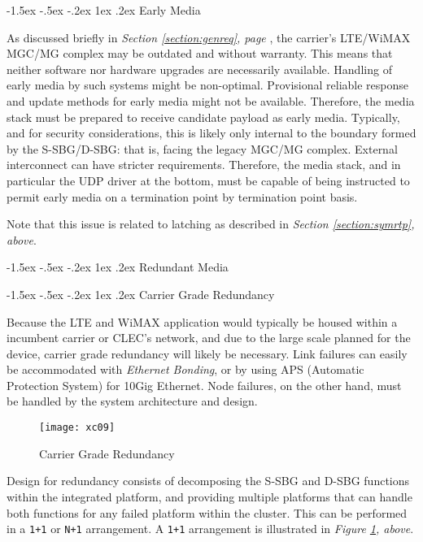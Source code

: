 \documentclass[letterpaper,final,notitlepage,twocolumn,10pt,twoside]{article}
\makeatletter
\let\normalsize = \small
\let\small = \footnotesize
\let\footnotesize = \scriptsize
\let\scriptsize = \tiny
\renewcommand\subsection{\@startsection{subsection}{2}{\z@}%
                                     {-1.5ex \@plus -.5ex \@minus -.2ex}%
                                     {1ex \@plus .2ex}%
                                     {\normalfont\normalsize\bfseries}}
\makeatother
\begin{document}
\subsection{Early Media}
\label{section:early}

As discussed briefly in {\sl Section \ref{section:genreq}, page
\pageref{section:genreq}}, the carrier's LTE/WiMAX MGC/MG complex may be
outdated and without warranty.  This means that neither software nor hardware
upgrades are necessarily available.  Handling of early media by such systems
might be non-optimal.  Provisional reliable response and update methods for
early media might not be available.  Therefore, the media stack must be
prepared to receive candidate payload as early media.  Typically, and for
security considerations, this is likely only internal to the boundary formed
by the S-SBG/D-SBG: that is, facing the legacy MGC/MG complex.  External
interconnect can have stricter requirements.  Therefore, the media stack, and
in particular the UDP driver at the bottom, must be capable of being
instructed to permit early media on a termination point by termination point
basis.

Note that this issue is related to latching as described in {\sl Section
\ref{section:symrtp}, above}.

\subsection{Redundant Media}
\label{section:redmed}

\subsection{Carrier Grade Redundancy}
\label{section:grade}

Because the LTE and WiMAX application would typically be housed within a
incumbent carrier or CLEC's network, and due to the large scale planned for the
device, carrier grade redundancy will likely be necessary.  Link failures can
easily be accommodated with {\it Ethernet Bonding}, or by using APS (Automatic
Protection System) for 10Gig Ethernet.  Node failures, on the other hand, must
be handled by the system architecture and design.

\begin{figure}[htp]
\center\texttt{[image: xc09]}
\caption{Carrier Grade Redundancy}
\label{figure:xc09}
\end{figure}

Design for redundancy consists of decomposing the S-SBG and D-SBG functions
within the integrated platform, and providing multiple platforms that can handle
both functions for any failed platform within the cluster.  This can be
performed in a {\tt 1+1} or {\tt N+1} arrangement.  A {\tt 1+1} arrangement is
illustrated in {\sl Figure \ref{figure:xc09}, above}.
\end{document}
